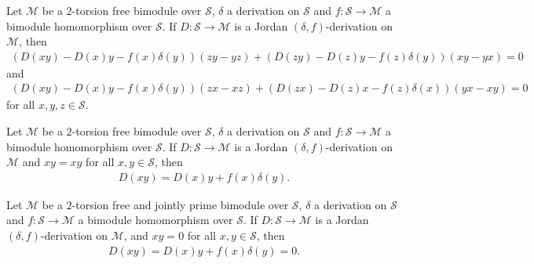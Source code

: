 \documentclass[10pt,a4paper]{amsart}
\begin{document}
\begin{lemma}\label{lemma3.3.6}
    Let $\mathcal{M}$ be a $2$-torsion free bimodule over $\mathcal{S}$, $\delta$ a derivation on $\mathcal{S}$ and $f : \mathcal{S} \rightarrow \mathcal{M}$ a bimodule homomorphism over $\mathcal{S}$. If $D:\mathcal{S} \rightarrow \mathcal{M}$ is a Jordan $(\delta,f)$-derivation on $\mathcal{M}$, then
    \begin{align*}
         (D(xy)-D(x)y-f(x)\delta (y))(zy-yz) + (D(zy)-D(z)y-f(z)\delta (y))(xy-yx) = 0
    \end{align*}
    and
    \begin{align*}
        (D(xy)-D(x)y-f(x)\delta(y))(zx-xz)+(D(zx)-D(z)x-f(z)\delta(x))(yx-xy) =0
    \end{align*}
    for all $x,y,z \in \mathcal{S}$.
\end{lemma}

\begin{lemma}\label{lemma3.3.7}
    Let $\mathcal{M}$ be a $2$-torsion free bimodule over $\mathcal{S}$, $\delta$ a derivation on $\mathcal{S}$ and $f : \mathcal{S} \rightarrow \mathcal{M}$ a bimodule homomorphism over $\mathcal{S}$. If $D:\mathcal{S} \rightarrow \mathcal{M}$ is a Jordan $(\delta,f)$-derivation on $\mathcal{M}$ and $xy=xy$ for all $x,y \in \mathcal{S}$, then
    \begin{align*}
        D(xy)=D(x)y+f(x)\delta(y).
    \end{align*}
\end{lemma}

\begin{lemma}\label{lemma3.3.8}
    Let $\mathcal{M}$ be a $2$-torsion free and jointly prime bimodule over $\mathcal{S}$, $\delta$ a derivation on $\mathcal{S}$ and $f : \mathcal{S} \rightarrow \mathcal{M}$ a bimodule homomorphism over $\mathcal{S}$. If $D:\mathcal{S} \rightarrow \mathcal{M}$ is a Jordan $(\delta,f)$-derivation on $\mathcal{M}$, and $xy=0$ for all $x,y \in \mathcal{S}$, then
    \begin{align*}
        D(xy) = D(x)y + f(x)\delta (y)=0.
    \end{align*}
\end{lemma}
\end{document}
